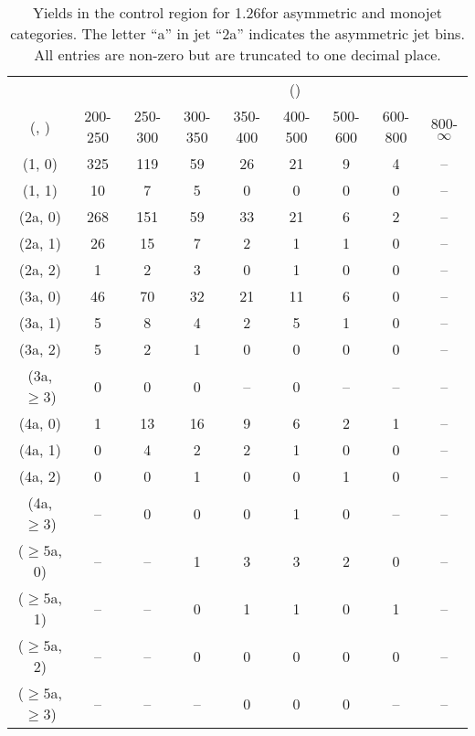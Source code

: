 \begin{table}[h!]
\tiny
\centering
\caption{Yields in the \mmj control region for 1.26\ifb for asymmetric and monojet categories. The letter ``a'' in jet \eg ``2a''  indicates the asymmetric jet bins. All entries are non-zero but are truncated to one decimal place.\label{tab:yieldssep_mumu_data_asym}}
\begin{tabular}
{ccccccccc}
	\hline\hline
&	& \multicolumn{8}{c}{\scalht (\gev)} \\ 
	 (\njet,  \nb) & 200-250 & 250-300 & 300-350 & 350-400 & 400-500 & 500-600 & 600-800 & 800-$\infty$ \\ [0.8ex] 
\hline
	(1, 0) & 325 & 119 & 59 & 26 & 21 & 9 & 4 & -- \\[0.5ex] 
	(1, 1) & 10 & 7 & 5 & 0 & 0 & 0 & 0 & -- \\[0.5ex] 
	(2a, 0) & 268 & 151 & 59 & 33 & 21 & 6 & 2 & -- \\[0.5ex] 
	(2a, 1) & 26 & 15 & 7 & 2 & 1 & 1 & 0 & -- \\[0.5ex] 
	(2a, 2) & 1 & 2 & 3 & 0 & 1 & 0 & 0 & -- \\[0.5ex] 
	(3a, 0) & 46 & 70 & 32 & 21 & 11 & 6 & 0 & -- \\[0.5ex] 
	(3a, 1) & 5 & 8 & 4 & 2 & 5 & 1 & 0 & -- \\[0.5ex] 
	(3a, 2) & 5 & 2 & 1 & 0 & 0 & 0 & 0 & -- \\[0.5ex] 
	(3a, $\ge3$) & 0 & 0 & 0 & -- & 0 & -- & -- & -- \\[0.5ex] 
	(4a, 0) & 1 & 13 & 16 & 9 & 6 & 2 & 1 & -- \\[0.5ex] 
	(4a, 1) & 0 & 4 & 2 & 2 & 1 & 0 & 0 & -- \\[0.5ex] 
	(4a, 2) & 0 & 0 & 1 & 0 & 0 & 1 & 0 & -- \\[0.5ex] 
	(4a, $\ge3$) & -- & 0 & 0 & 0 & 1 & 0 & -- & -- \\[0.5ex] 
	($\ge5$a, 0) & -- & -- & 1 & 3 & 3 & 2 & 0 & -- \\[0.5ex] 
	($\ge5$a, 1) & -- & -- & 0 & 1 & 1 & 0 & 1 & -- \\[0.5ex] 
	($\ge5$a, 2) & -- & -- & 0 & 0 & 0 & 0 & 0 & -- \\[0.5ex] 
	($\ge5$a, $\ge3$) & -- & -- & -- & 0 & 0 & 0 & -- & -- \\[0.5ex] 
	\hline
	\hline
\end{tabular}
\end{table}
